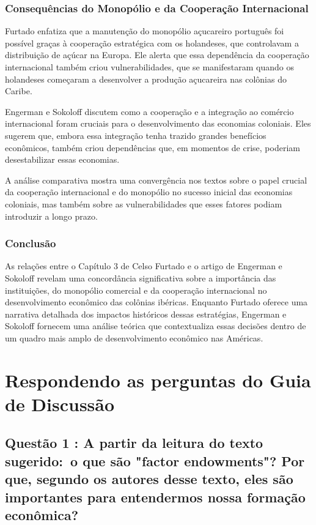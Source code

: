 \documentclass[a4paper,12pt]{article}[abntex2]
\begin{document}
\subsubsection*{Consequências do Monopólio e da Cooperação Internacional}

Furtado enfatiza que a manutenção do monopólio açucareiro português foi possível graças à cooperação estratégica com os holandeses, que controlavam a distribuição de açúcar na Europa. Ele alerta que essa dependência da cooperação internacional também criou vulnerabilidades, que se manifestaram quando os holandeses começaram a desenvolver a produção açucareira nas colônias do Caribe.

Engerman e Sokoloff discutem como a cooperação e a integração ao comércio internacional foram cruciais para o desenvolvimento das economias coloniais. Eles sugerem que, embora essa integração tenha trazido grandes benefícios econômicos, também criou dependências que, em momentos de crise, poderiam desestabilizar essas economias.

A análise comparativa mostra uma convergência nos textos sobre o papel crucial da cooperação internacional e do monopólio no sucesso inicial das economias coloniais, mas também sobre as vulnerabilidades que esses fatores podiam introduzir a longo prazo.

\subsubsection*{Conclusão}

As relações entre o Capítulo 3 de Celso Furtado e o artigo de Engerman e Sokoloff revelam uma concordância significativa sobre a importância das instituições, do monopólio comercial e da cooperação internacional no desenvolvimento econômico das colônias ibéricas. Enquanto Furtado oferece uma narrativa detalhada dos impactos históricos dessas estratégias, Engerman e Sokoloff fornecem uma análise teórica que contextualiza essas decisões dentro de um quadro mais amplo de desenvolvimento econômico nas Américas.

\newpage
\section{\textbf{Respondendo as perguntas do Guia de Discussão}}

\subsection{\textbf{Questão 1 : A partir da leitura do texto sugerido: o que são "factor endowments"? Por que, segundo os autores desse texto, eles são importantes para entendermos nossa formação econômica?
}}
\end{document}

